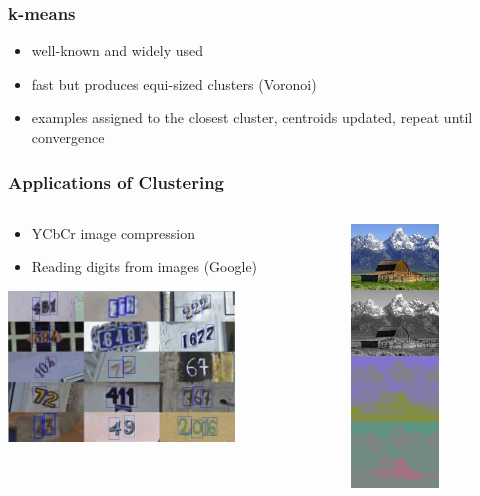 \documentclass{beamer}
\begin{document}
\begin{frame}
\frametitle{k-means}
    \begin{itemize}
    \item well-known and widely used
    \item fast but produces equi-sized clusters (Voronoi)
    \item examples assigned to the closest cluster, centroids updated, repeat until convergence
    \end{itemize}
\end{frame}

\begin{frame}
\frametitle{Applications of Clustering}
    \begin{columns}[t]
        \begin{column}[T]{9cm}
        \begin{itemize}
        \item YCbCr image compression
        \item Reading digits from images (Google)
        \end{itemize}

        \vspace{10mm}
        \hspace{7mm}
        \includegraphics[height=4cm]{googlehousenumbers.jpg}

        \end{column}

        \begin{column}[T]{10cm}
        \includegraphics[height=7cm]{YCbCr-separation-small.jpg}
        \end{column}
    \end{columns}
\end{frame} 
\end{document}
